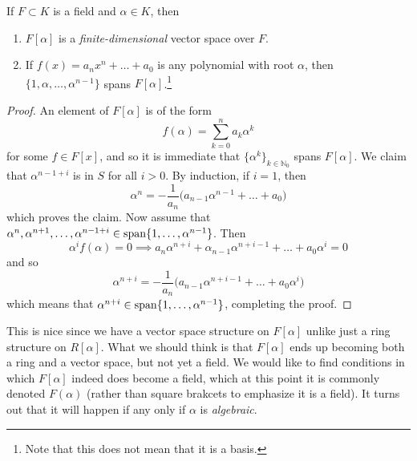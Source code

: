   \begin{lemma}
    If $F \subset K$ is a field and $\alpha \in K$, then 
    \begin{enumerate}
      \item $F[\alpha]$ is a \textit{finite-dimensional} vector space over $F$. 
      \item If $f(x) = a_n x^n + \ldots + a_0$ is any polynomial with root $\alpha$, then $\{1, \alpha, \ldots, \alpha^{n-1}\}$ spans $F[\alpha]$.\footnote{Note that this does not mean that it is a basis.} 
    \end{enumerate}
  \end{lemma}
  \begin{proof}
    An element of $F[\alpha]$ is of the form 
    \begin{equation}
      f(\alpha) = \sum_{k=0}^n a_k \alpha^k
    \end{equation} 
    for some $f \in F[x]$, and so it is immediate that $\{\alpha^k\}_{k \in \mathbb{N}_0}$ spans $F[\alpha]$. We claim that $\alpha^{n-1+i}$ is in $S$ for all $i > 0$. By induction, if $i = 1$, then 
    \begin{equation}
      \alpha^n = -\frac{1}{a_n} \big( a_{n-1} \alpha^{n-1} + \ldots + a_0 \big)
    \end{equation}
    which proves the claim. Now assume that $\alpha^n, \alpha^{n+1}, \ldots, \alpha^{n-1+i} \in \operatorname{span}\{1, \ldots, \alpha^{n-1}\}$. Then 
    \begin{equation}
      \alpha^i f(\alpha) = 0 \implies a_n \alpha^{n+i} + \alpha_{n-1} \alpha^{n+i-1} + \ldots + a_0 \alpha^i = 0 
    \end{equation}
    and so 
    \begin{equation}
      \alpha^{n+i} = -\frac{1}{a_n} \big(a_{n-1} \alpha^{n+i-1} + \ldots + a_0 \alpha^i)
    \end{equation}
    which means that $\alpha^{n+i} \in \operatorname{span}\{1, \ldots, \alpha^{n-1}\}$, completing the proof. 
  \end{proof} 

  This is nice since we have a vector space structure on $F[\alpha]$ unlike just a ring structure on $R[\alpha]$. What we should think is that $F[\alpha]$ ends up becoming both a ring and a vector space, but not yet a field. We would like to find conditions in which $F[\alpha]$ indeed does become a field, which at this point it is commonly denoted $F(\alpha)$ (rather than square brakcets to emphasize it is a field). It turns out that it will happen if any only if $\alpha$ is \textit{algebraic}.  

